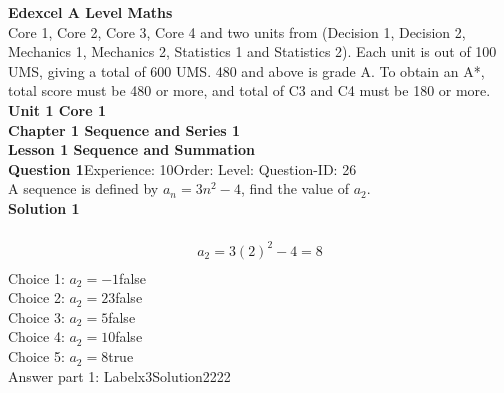 \documentclass{article}
\begin{document}
\noindent\Huge{\textbf{Edexcel A Level Maths}}\\[5pt]
\noindent\large{Core 1, Core 2, Core 3, Core 4 and two units from (Decision 1, Decision 2, Mechanics 1, Mechanics 2, Statistics 1 and Statistics 2).  Each unit is out of 100 UMS, giving a total of 600 UMS.  480 and above is grade A.  To obtain an A*, total score must be 480 or more, and total of C3 and C4 must be 180 or more.}\\[20pt]
\noindent\huge{\textbf{Unit 1 Core 1}}\\[18pt]
\noindent\huge{\textbf{Chapter 1 Sequence and Series 1}}\\[15pt]
\noindent\large{\textbf{Lesson 1 Sequence and Summation}}\\[12pt]
\noindent\textbf{Question 1}\hspace{20pt}Experience: 10\hspace{20pt}Order: \hspace{20pt}Level: \hspace{20pt}Question-ID: 26\\[2pt]
A sequence is defined by $a_n=3n^2-4$, find the value of $a_2$.\\[4pt]
\noindent\textbf{Solution 1}\\[2pt]
\\[-35pt]\begin{align*}
a_2=3(2)^2-4=8\\[2pt]
\end{align*}
Choice 1: \hspace{20pt}$a_2=-1$\hspace{20pt}false\\
Choice 2: \hspace{20pt}$a_2=23$\hspace{20pt}false\\
Choice 3: \hspace{20pt}$a_2=5$\hspace{20pt}false\\
Choice 4: \hspace{20pt}$a_2=10$\hspace{20pt}false\\
Choice 5: \hspace{20pt}$a_2=8$\hspace{20pt}true\\
Answer part 1: \hspace{10pt}Label\hspace{10pt}x3\hspace{10pt}Solution\hspace{10pt}2222\\
\end{document}
